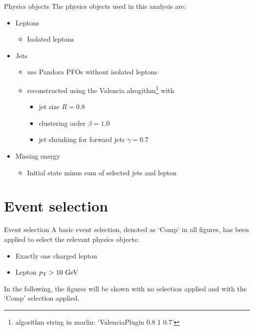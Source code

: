 \documentclass{beamer}
\begin{document}
\begin{frame}{Physics objects}
The physics objects used in this analysis are:
\begin{itemize}
  \item Leptons
  \begin{itemize}
    \item Isolated leptons
  \end{itemize}
  \item Jets
  \begin{itemize}
    \item use Pandora PFOs without isolated leptons
    \item reconstructed using the Valencia alrogithm\footnote{algorithm string in marlin: `ValenciaPlugin 0.8 1 0.7'} with
    \begin{itemize}
      \item jet size $R=0.8$
      \item clustering order $\beta=1.0$
      \item jet shrinking for forward jets $\gamma=0.7$
    \end{itemize}
  \end{itemize}
  \item Missing energy
  \begin{itemize}
    \item Initial state minus sum of selected jets and lepton
  \end{itemize}
\end{itemize}
\end{frame}











\section{Event selection}

\begin{frame}{Event selection}
A basic event selection, denoted as `Comp' in all figures, has been applied to select the relevant physics objects:
\begin{itemize}
\item Exactly one charged lepton
\item Lepton $p_\mathrm{T} > 10~\mathrm{GeV}$
\end{itemize}
In the following, the figures will be shown with no selection applied and with the `Comp' selection applied.
\end{frame}
\end{document}
